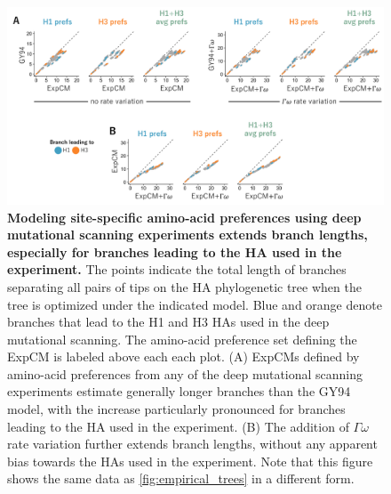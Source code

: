 \documentclass[11pt]{article}
\begin{document}
\begin{figure}[h!]
\centerline{\includegraphics[width=\textwidth]{fig5.pdf}}
\caption{\label{fig:empirical_scatter}
\textbf{Modeling site-specific amino-acid preferences using deep mutational scanning experiments extends branch lengths, especially for branches leading to the HA used in the experiment.}
The points indicate the total length of branches separating all pairs of tips on the HA phylogenetic tree when the tree is optimized under the indicated model. 
Blue and orange denote branches that lead to the H1 and H3 HAs used in the deep mutational scanning. 
The amino-acid preference set defining the ExpCM is labeled above each each plot.
(A) ExpCMs defined by amino-acid preferences from any of the deep mutational scanning experiments estimate generally longer branches than the GY94 model, with the increase particularly pronounced for branches leading to the HA used in the experiment. 
(B) The addition of $\Gamma\omega$ rate variation further extends branch lengths, without any apparent bias towards the HAs used in the experiment.
Note that this figure shows the same data as \ref{fig:empirical_trees} in a different form.
}
\end{figure}
\newpage
\end{document}
